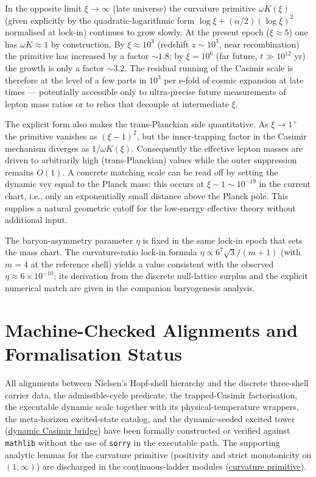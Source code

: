 \documentclass[11pt]{amsart}
\begin{document}
In the opposite limit \(\xi\to\infty\) (late universe) the curvature primitive \(\omega K(\xi)\) (given explicitly by the quadratic-logarithmic form \(\log\xi + (\alpha/2)(\log\xi)^2\) normalised at lock-in) continues to grow slowly. At the present epoch (\(\xi \approx 5\)) one has \(\omega K \approx 1\) by construction. By \(\xi \approx 10^3\) (redshift \(z\sim 10^3\), near recombination) the primitive has increased by a factor \(\sim 1.8\); by \(\xi = 10^6\) (far future, \(t \gg 10^{12}\) yr) the growth is only a factor \(\sim 3.2\). The residual running of the Casimir scale is therefore at the level of a few parts in \(10^3\) per e-fold of cosmic expansion at late times — potentially accessible only to ultra-precise future measurements of lepton mass ratios or to relics that decouple at intermediate \(\xi\).

The explicit form also makes the trans-Planckian side quantitative. As \(\xi \to 1^+\) the primitive vanishes as \((\xi-1)^2\), but the inner-trapping factor in the Casimir mechanism diverges as \(1/\omega K(\xi)\). Consequently the effective lepton masses are driven to arbitrarily high (trans-Planckian) values while the outer suppression remains \(O(1)\). A concrete matching scale can be read off by setting the dynamic vev equal to the Planck mass: this occurs at \(\xi - 1 \sim 10^{-19}\) in the current chart, i.e., only an exponentially small distance above the Planck pole. This supplies a natural geometric cutoff for the low-energy effective theory without additional input.

The baryon-asymmetry parameter \(\eta\) is fixed in the same lock-in epoch that sets the mass chart. The curvature-ratio lock-in formula \(\eta\propto 6^7\sqrt{3}/(m+1)\) (with \(m=4\) at the reference shell) yields a value consistent with the observed \(\eta\approx 6\times 10^{-10}\); its derivation from the discrete null-lattice surplus and the explicit numerical match are given in the companion baryogenesis analysis.

\section{Machine-Checked Alignments and Formalisation Status}

All alignments between Nielsen's Hopf-shell hierarchy and the discrete three-shell carrier data, the admissible-cycle predicate, the trapped-Casimir factorisation, the executable dynamic scale together with its physical-temperature wrappers, the meta-horizon excited-state catalog, and the dynamic-seeded excited tower (\hyperref[lean:casimir-bridge]{dynamic Casimir bridge}) have been formally constructed or verified against \texttt{mathlib} without the use of \texttt{sorry} in the executable path. The supporting analytic lemmas for the curvature primitive (positivity and strict monotonicity on $(1,\infty)$) are discharged in the continuous-ladder modules (\hyperref[lean:curvature-primitive]{curvature primitive}).
\end{document}
